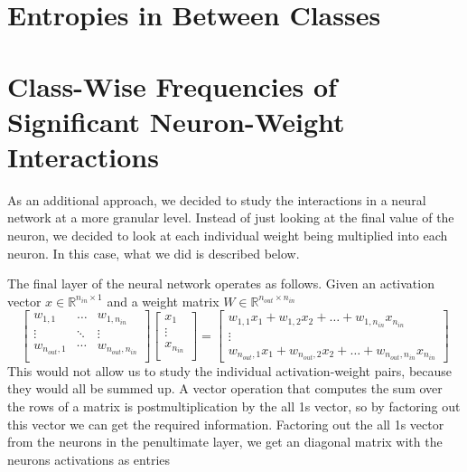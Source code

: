 \documentclass{article}
\begin{document}
    \section{Entropies in Between Classes}
        
    \section{Class-Wise Frequencies of Significant Neuron-Weight Interactions}
    As an additional approach, we decided to study the interactions in a neural network at a more granular level. Instead of just looking at the final value of the neuron, we decided to look at each individual weight being multiplied into each neuron. In this case, what we did is described below. 

    The final layer of the neural network operates as follows. Given an activation vector $x \in \mathbb{R}^{n_{in} \times 1}$ and a weight matrix $W \in \mathbb{R}^{n_{out} \times n_{in}}$ 
        \[
            \begin{bmatrix}
                w_{1,1} & \dots & w_{1,n_{in}} \\
                \vdots & \ddots & \vdots \\
                w_{n_{out}, 1} & \cdots & w_{n_{out}, n_{in}} \\
            \end{bmatrix}
            \begin{bmatrix}
                x_1 \\
                \vdots \\
                x_{n_{in}} \\
            \end{bmatrix}
            = 
            \begin{bmatrix}
                w_{1,1}x_1 + w_{1, 2}x_2 + \dots + w_{1, n_{in}}x_{n_{in}} \\
                \vdots \\
                w_{n_{out},1}x_1 + w_{n_{out}, 2}x_2 + \dots + w_{n_{out}, n_{in}}x_{n_{in}}
            \end{bmatrix}
        \]
        This would not allow us to study the individual activation-weight pairs, because they would all be summed up. A vector operation that computes the sum over the rows of a matrix is postmultiplication by the all 1s vector, so by factoring out this vector we can get the required information. Factoring out the all 1s vector from the neurons in the penultimate layer, we get an diagonal matrix with the neurons activations as entries 
\end{document}
